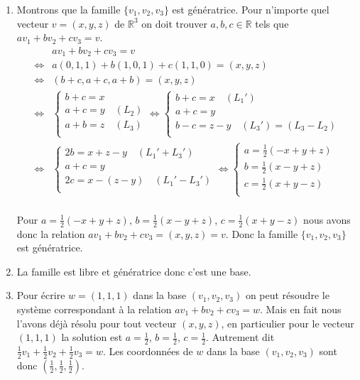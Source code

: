 \documentclass[11pt,a4paper]{article}
\newcommand{\Rr}{\mathbb{R}} \newcommand{\R}{\mathbb{R}}
\begin{document}
\begin{enumerate}
\begin{enumerate}
    \item Montrons que la famille $\{ v_1, v_2, v_3\}$ est génératrice. Pour n'importe quel
vecteur $v=(x,y,z)$ de $\Rr^3$ on doit trouver $a,b,c\in\Rr$ tels que $a v_1+b v_2 + c v_3 = v$.
\begin{align*}
  &  a v_1+b v_2 + c v_3 = v \\
\iff & a (0,1,1) + b(1,0,1) + c(1,1,0) = (x,y,z) \\
\iff & (b+c,a+c,a+b)=(x,y,z) \\
\iff & \begin{cases}
       b+c = x \\
       a+c = y \quad (L_2) \\
       a+b = z \quad (L_3) \\
       \end{cases} 
\iff  \begin{cases}
       b+c = x \quad (L_1')\\
       a+c = y \\
       b-c = z-y  \quad(L_3')=(L_3-L_2)\\
       \end{cases} \\
\iff & \begin{cases}
       2b = x+z-y \quad (L_1'+L_3') \\
       a+c = y \\
       2c = x-(z-y) \quad  (L_1'-L_3')  \\
       \end{cases} 
\iff  \begin{cases}
       a = \frac12 (-x+y+z) \\
       b = \frac12 (x-y+z) \\
       c = \frac12 (x+y-z) \\
       \end{cases} \\
\end{align*}


Pour $a= \frac12 (-x+y+z)$, $b= \frac12 (x-y+z)$, $c = \frac12 (x+y-z)$ nous avons donc
la relation $av_1+bv_2+cv_3=(x,y,z)=v$. Donc la famille $\{ v_1, v_2, v_3\}$ est génératrice.


    \item La famille est libre et génératrice  donc c'est une base.

    \item Pour écrire  $w=(1,1,1)$ dans la base $(v_1,v_2,v_3)$  on peut résoudre le système correspondant
à la relation $a v_1+b v_2 + c v_3 = w$.
Mais en fait nous l'avons déjà résolu pour tout vecteur $(x,y,z)$, en particulier pour le vecteur
$(1,1,1)$ la solution est $a=\frac 12$, $b=\frac 12$, $c=\frac 12$.
Autrement dit $\frac 12 v_1+\frac 12 v_2 + \frac 12 v_3 = w$. Les coordonnées de $w$ dans la base $(v_1,v_2,v_3)$
sont donc $(\frac12,\frac12,\frac12)$.


\end{enumerate}
\end{enumerate}
\end{document}
